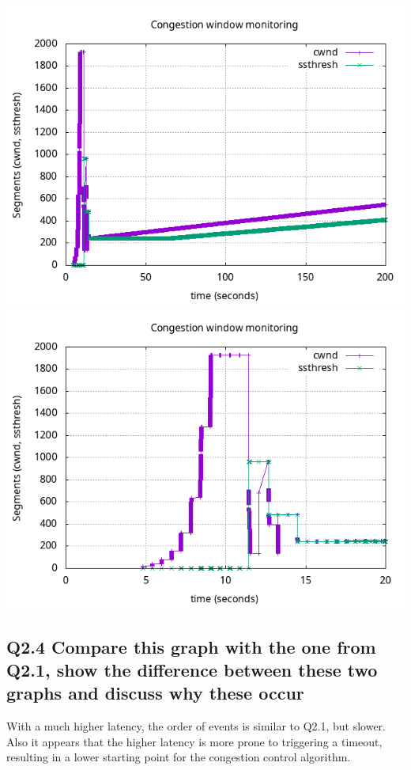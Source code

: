 \documentclass{article}
\begin{document}
\includegraphics[scale=0.5]{plots/lab1-group5-task2-question2.3.png}
\includegraphics[scale=0.5]{plots/lab1-group5-task2-question2.3-xrange-0-20.png}

\subsection{Q2.4 Compare this graph with the one from Q2.1, show the difference between these two
graphs and discuss why these occur}

With a much higher latency, the order of events is similar to Q2.1, but slower. Also it appears that the higher latency is more prone to triggering a timeout, resulting in a lower starting point for the congestion control algorithm.
\end{document}
